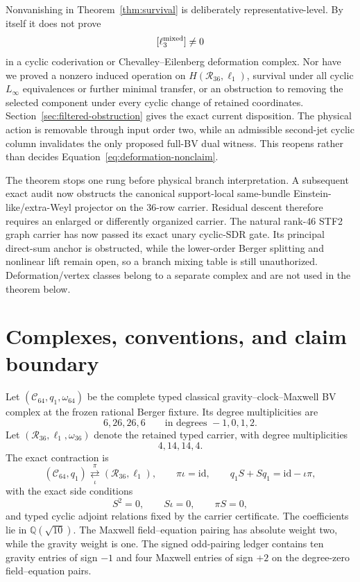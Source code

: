 \documentclass[11pt]{article}
\theoremstyle{definition}
\theoremstyle{remark}
\newcommand{\Q}{\mathbb Q}
\newcommand{\cC}{\mathcal C}
\newcommand{\cR}{\mathcal R}
\newcommand{\id}{\mathrm{id}}
\begin{document}
Nonvanishing in Theorem~\ref{thm:survival} is deliberately
representative-level.  By itself it does not prove
\begin{equation}\label{eq:deformation-nonclaim}
 [\ell_3^{\rm mixed}]\neq0
\end{equation}
in a cyclic coderivation or Chevalley--Eilenberg deformation complex.  Nor
have we proved a nonzero induced operation on $H(\cR_{36},\ell_1)$, survival
under all cyclic $L_\infty$ equivalences or further minimal transfer, or an
obstruction to removing the selected component under every cyclic change of
retained coordinates.  Section~\ref{sec:filtered-obstruction} gives the exact
current disposition.  The physical action is removable through input order
two, while an admissible second-jet cyclic column invalidates the only
proposed full-BV dual witness.  This reopens rather than decides
Equation~\eqref{eq:deformation-nonclaim}.

The theorem stops one rung before physical branch interpretation.  A
subsequent exact audit now obstructs the canonical support-local same-bundle
Einstein-like/extra-Weyl projector on the $36$-row carrier.  Residual descent
therefore requires an enlarged or differently organized carrier.  The
natural rank-$46$ STF2 graph carrier has now passed its exact unary cyclic-SDR
gate.  Its principal direct-sum anchor is obstructed, while the lower-order
Berger splitting and nonlinear lift remain open, so a branch mixing table is
still unauthorized.  Deformation/vertex classes belong to a separate complex
and are not used in the theorem below.

\section{Complexes, conventions, and claim boundary}\label{sec:setup}

Let $(\cC_{64},q_1,\omega_{64})$ be the complete typed classical
gravity--clock--Maxwell BV complex at the frozen rational Berger fixture.
Its degree multiplicities are
\begin{equation}
 6,26,26,6\qquad\text{in degrees }-1,0,1,2.
\end{equation}
Let $(\cR_{36},\ell_1,\omega_{36})$ denote the retained typed carrier, with
degree multiplicities
\begin{equation}
 4,14,14,4.
\end{equation}
The exact contraction is
\begin{equation}\label{eq:sdr}
 \left(\cC_{64},q_1\right)
 \underset{\iota}{\overset{\pi}{\rightleftarrows}}
 \left(\cR_{36},\ell_1\right),
 \qquad
 \pi\iota=\id,
 \qquad
 q_1S+Sq_1=\id-\iota\pi,
\end{equation}
with the exact side conditions
\begin{equation}\label{eq:side-conditions}
 S^2=0,\qquad S\iota=0,\qquad \pi S=0,
\end{equation}
and typed cyclic adjoint relations fixed by the carrier certificate.  The
coefficients lie in $\Q(\sqrt{10})$.  The Maxwell
field--equation pairing has absolute weight two, while the gravity weight is
one.  The signed odd-pairing ledger contains ten gravity entries of sign
$-1$ and four Maxwell entries of sign $+2$ on the degree-zero
field--equation pairs.
\end{document}
